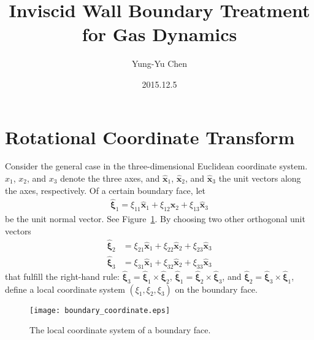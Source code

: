 \documentclass[a4paper,12pt,dvips]{article}
\begin{document}
\title{Inviscid Wall Boundary Treatment for Gas Dynamics}
\author{Yung-Yu Chen}
\date{2015.12.5}

\maketitle

\tableofcontents

\hspace{.5cm}

\section{Rotational Coordinate Transform}

Consider the general case in the three-dimensional Euclidean coordinate system.
%
$x_1$, $x_2$, and $x_3$
%
denote the three axes, and
%
$\hat{\mathbf{x}}_1$, $\hat{\mathbf{x}}_2$, and $\hat{\mathbf{x}}_3$
%
the unit vectors along the axes, respectively.  Of a certain boundary face, let
%
\begin{align*}
  \hat{\boldsymbol{\xi}}_1
  = \xi_{11} \hat{\mathbf{x}}_1
  + \xi_{12} \hat{\mathbf{x}}_2
  + \xi_{13} \hat{\mathbf{x}}_3
\end{align*}
%
be the unit normal vector.  See Figure~\ref{f:boundary_coordinate}.  By
choosing two other orthogonal unit vectors
%
\begin{align*}
  \hat{\boldsymbol{\xi}}_2
 &= \xi_{21} \hat{\mathbf{x}}_1
  + \xi_{22} \hat{\mathbf{x}}_2
  + \xi_{23} \hat{\mathbf{x}}_3
  \\
  \hat{\boldsymbol{\xi}}_3
 &= \xi_{31} \hat{\mathbf{x}}_1
  + \xi_{32} \hat{\mathbf{x}}_2
  + \xi_{33} \hat{\mathbf{x}}_3
\end{align*}
%
that fulfill the right-hand rule:
%
$\hat{\boldsymbol{\xi}}_3 = \hat{\boldsymbol{\xi}}_1 \times
\hat{\boldsymbol{\xi}}_2$,
%
$\hat{\boldsymbol{\xi}}_1 = \hat{\boldsymbol{\xi}}_2 \times
\hat{\boldsymbol{\xi}}_3$, and
%
$\hat{\boldsymbol{\xi}}_2 = \hat{\boldsymbol{\xi}}_3 \times
\hat{\boldsymbol{\xi}}_1$,
%
define a local coordinate system $(\xi_1, \xi_2, \xi_3)$ on the boundary face.

\begin{figure}[htbp]
\centering
\texttt{[image: boundary\_coordinate.eps]}
\caption{The local coordinate system of a boundary face.}
\label{f:boundary_coordinate}
\end{figure}
\end{document}
